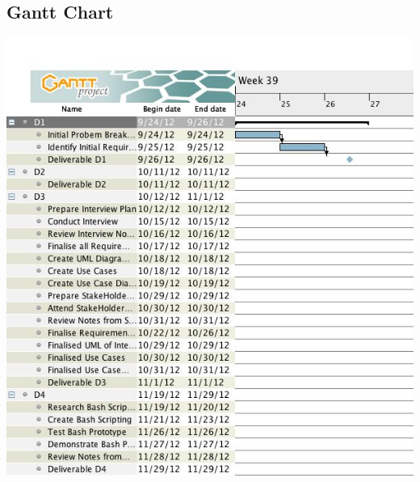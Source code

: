 \documentclass{l3deliverable}
\begin{document}
{\subsection{Gantt Chart}
\includegraphics[scale=0.7]{img/GANTT D1.jpg}\\

}
\end{document}
